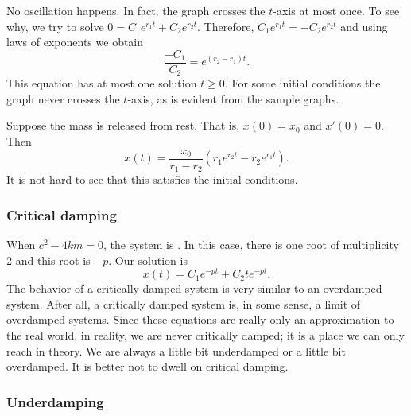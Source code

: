 
No oscillation happens.  In fact, the graph crosses the
$t$-axis at most once.  To see why, we try to solve
$0 = C_1 e^{r_1 t} + C_2 e^{r_2 t}$.
Therefore, $C_1 e^{r_1 t} = - C_2 e^{r_2 t}$ and using laws of exponents we
obtain
\begin{equation*}
\frac{-C_1}{C_2} = e^{(r_2-r_1) t} .
\end{equation*}
This equation has at most one solution $t \geq 0$.
For some initial conditions the graph never crosses the $t$-axis, as is
evident from the sample graphs.

\begin{example}
Suppose the mass is released from rest.  That is,
$x(0) = x_0$ and $x'(0) = 0$.
Then
\begin{equation*}
x(t) = \frac{x_0}{r_1-r_2} \left(r_1 e^{r_2 t} - r_2 e^{r_1 t} \right) .
\end{equation*}
It is not hard to see that this satisfies the initial conditions.
\end{example}

\subsubsection{Critical damping}

When
$c^2 - 4km = 0$, the system is \emph{}.  In this case,
there is one root of multiplicity 2 and this root is $-p$.  Our solution is
\begin{equation*}
x(t) = C_1 e^{-pt} + C_2 t e^{-pt} .
\end{equation*}
The behavior of a critically damped system is very similar to an overdamped
system.  After all, a critically damped system is, in some sense, a limit
of overdamped systems.  Since these equations are really only an
approximation to the real world, in reality, we are never critically
damped; it is a place we can only reach in theory.  We are always
a little bit underdamped or a little bit overdamped.  It is better not to
dwell on critical damping.

\subsubsection{Underdamping}

